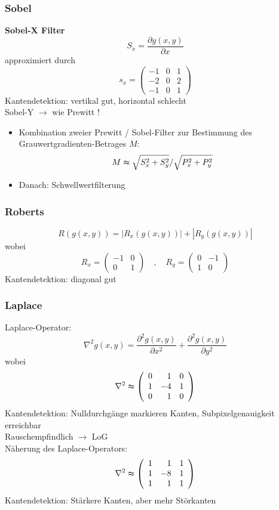 \subsubsection{Sobel}

\textbf{Sobel-X Filter} $$S_x = \frac{\partial g(x,y)}{\partial x}$$ approximiert durch $$s_x = \left( \begin{array}{ccc} -1 & 0 & 1 \\ -2 & 0 & 2 \\ -1 & 0 & 1 \end{array} \right)$$
Kantendetektion: vertikal gut, horizontal schlecht \\
Sobel-Y $\to$ wie Prewitt !

\begin{itemize}
\item Kombination zweier Prewitt / Sobel-Filter zur Bestimmung des Grauwertgradienten-Betrages $M$: $$M \thickapprox \sqrt{S_x^2 + S_y^2} / \sqrt{P_x^2 + P_y^2}$$
\item Danach: Schwellwertfilterung
\end{itemize}

\subsubsection{Roberts}

$$R(g(x,y)) = |R_x(g(x,y))| + |R_y(g(x,y))|$$ wobei $$R_x = \left( \begin{array}{rr} -1 & 0 \\ 0 & 1 \end{array} \right) \quad , \quad R_y = \left( \begin{array}{rr} 0 & -1 \\ 1 & 0 \end{array} \right)$$
Kantendetektion: diagonal gut

\subsubsection*{Laplace}

Laplace-Operator: $$\nabla^2 g(x,y) = \frac{\partial^2 g(x,y)}{\partial x^2} + \frac{\partial^2 g(x,y)}{\partial y^2}$$ wobei $$\nabla^2 \thickapprox \left( \begin{array}{rrr} 0 & 1 & 0 \\ 1 & -4 & 1 \\ 0 & 1 & 0 \end{array} \right)$$
Kantendetektion: Nulldurchgänge markieren Kanten, Subpixelgenauigkeit erreichbar \\
Rauschempfindlich $\to$ LoG \\
Näherung des Laplace-Operators: $$\nabla^2 \thickapprox \left( \begin{array}{rrr} 1 & 1 & 1 \\ 1 & -8 & 1 \\ 1 & 1 & 1 \end{array} \right)$$
Kantendetektion: Stärkere Kanten, aber mehr Störkanten

